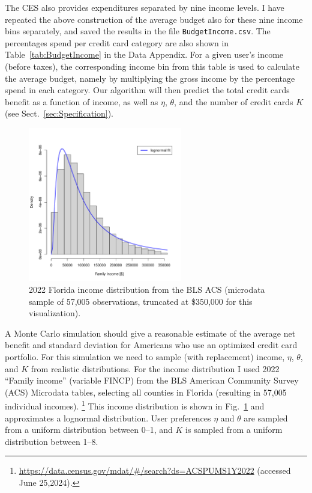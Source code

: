 The CES also provides expenditures separated by nine income levels. 
I have repeated the above construction of the average budget also for these nine income bins separately, and saved the results in the file \texttt{BudgetIncome.csv}. The percentages spend per credit card category are also shown in Table~\ref{tab:BudgetIncome} in the Data Appendix.
For a given user's income (before taxes), the corresponding income bin from this table is used to calculate the average budget, namely by multiplying the gross income by the percentage spend in each category. 
Our algorithm will then predict the total credit cards benefit as a function of income, as well as $\eta$, $\theta$, and the number of credit cards $K$ (see Sect.~\ref{sec:Specification}). 

\begin{figure}[t!h]
    \begin{center}
    \includegraphics[width=0.6\textwidth]{../Figures/IncomeDistribution.pdf}
    \caption{2022 Florida income distribution from the BLS ACS (microdata sample of 57,005 observations, truncated at \$350,000 for this visualization).}
    \label{fig:IncomeDistribution}
    \end{center}
\end{figure}

A Monte Carlo simulation should give a reasonable estimate of the average net benefit and standard deviation for Americans who use an optimized credit card portfolio. 
For this simulation we need to sample (with replacement) income, $\eta$, $\theta$, and $K$ from realistic distributions. 
For the income distribution I used 2022 ``Family income'' (variable FINCP) from the BLS American Community Survey (ACS) Microdata tables, selecting all counties in Florida (resulting in 57,005 individual incomes).%
\footnote{\url{https://data.census.gov/mdat/\#/search?ds=ACSPUMS1Y2022} (accessed June 25,2024).}
This income distribution is shown in Fig.~\ref{fig:IncomeDistribution} and approximates a lognormal distribution.
User preferences $\eta$ and $\theta$ are sampled from a uniform distribution between 0--1, and $K$ is sampled from a uniform distribution between 1--8.
